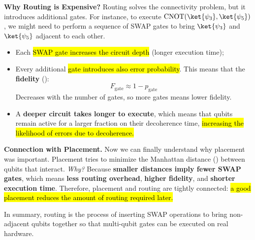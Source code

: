 \highspace
\textcolor{Red2}{ \textbf{Why Routing is Expensive?}} Routing solves the connectivity problem, but it introduces additional gates. For instance, to execute $\text{CNOT}(\ket{\psi_{3}}, \ket{\psi_{5}})$, we might need to perform a sequence of SWAP gates to bring $\ket{\psi_{3}}$ and $\ket{\psi_{5}}$ adjacent to each other.
\begin{itemize}
    \item Each \hl{SWAP gate increases the circuit depth} (longer execution time);
    \item Every additional \hl{gate introduces also error probability}. This means that the \textbf{fidelity} ():
    \begin{equation*}
        F_{\text{gate}} \approx 1 - p_{\text{gate}}
    \end{equation*}
    Decreases with the number of gates, so more gates means lower fidelity.
    \item A \textbf{deeper circuit takes longer to execute}, which means that qubits remain active for a larger fraction on their decoherence time, \hl{increasing the likelihood of errors due to decoherence.}
\end{itemize}

\noindent
\textcolor{Green3}{ \textbf{Connection with Placement.}} Now we can finally understand why placement was important. Placement tries to minimize the Manhattan distance () between qubits that interact. \emph{Why?} Because \textbf{smaller distances imply fewer SWAP gates}, which means \textbf{less routing overhead}, \textbf{higher fidelity}, and \textbf{shorter execution time}. Therefore, placement and routing are tightly connected: \hl{a good placement reduces the amount of routing required later.}

\highspace
In summary, routing is the process of inserting SWAP operations to bring non-adjacent qubits together so that multi-qubit gates can be executed on real hardware.